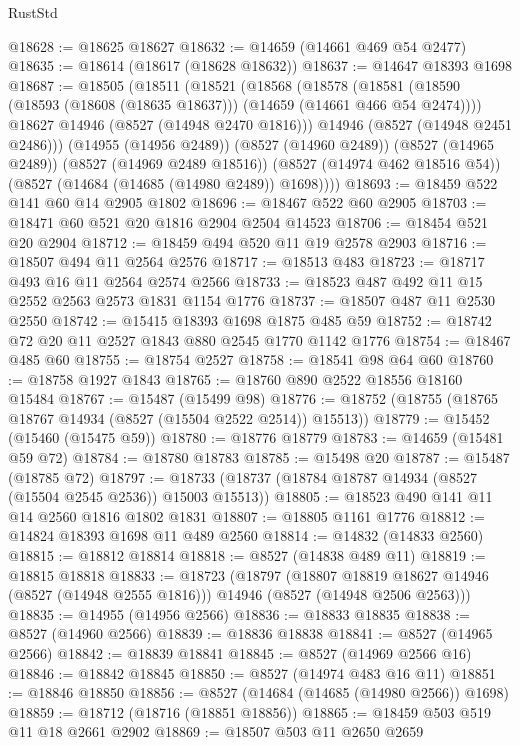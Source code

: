 \begin{lexlean}{RustStd}
\begin{coremodule}
@18628 := @18625 @18627
@18632 := @14659 (@14661 @469 @54 @2477)
@18635 := @18614 (@18617 (@18628 @18632))
@18637 := @14647 @18393 @1698
@18687 := @18505
    (@18511
      (@18521
        (@18568
          (@18578
            (@18581 (@18590 (@18593 (@18608 (@18635 @18637))) (@14659 (@14661 @466 @54 @2474))))
            @18627
            @14946
            (@8527 (@14948 @2470 @1816)))
          @14946
          (@8527 (@14948 @2451 @2486)))
        (@14955 (@14956 @2489))
        (@8527 (@14960 @2489))
        (@8527 (@14965 @2489))
        (@8527 (@14969 @2489 @18516))
        (@8527 (@14974 @462 @18516 @54))
        (@8527 (@14684 (@14685 (@14980 @2489)) @1698))))
@18693 := @18459 @522 @141 @60 @14 @2905 @1802
@18696 := @18467 @522 @60 @2905
@18703 := @18471 @60 @521 @20 @1816 @2904 @2504 @14523
@18706 := @18454 @521 @20 @2904
@18712 := @18459 @494 @520 @11 @19 @2578 @2903
@18716 := @18507 @494 @11 @2564 @2576
@18717 := @18513 @483
@18723 := @18717 @493 @16 @11 @2564 @2574 @2566
@18733 := @18523 @487 @492 @11 @15 @2552 @2563 @2573 @1831 @1154 @1776
@18737 := @18507 @487 @11 @2530 @2550
@18742 := @15415 @18393 @1698 @1875 @485 @59
@18752 := @18742 @72 @20 @11 @2527 @1843 @880 @2545 @1770 @1142 @1776
@18754 := @18467 @485 @60
@18755 := @18754 @2527
@18758 := @18541 @98 @64 @60
@18760 := @18758 @1927 @1843
@18765 := @18760 @890 @2522 @18556 @18160 @15484
@18767 := @15487 (@15499 @98)
@18776 := @18752 (@18755 (@18765 @18767 @14934 (@8527 (@15504 @2522 @2514)) @15513))
@18779 := @15452 (@15460 (@15475 @59))
@18780 := @18776 @18779
@18783 := @14659 (@15481 @59 @72)
@18784 := @18780 @18783
@18785 := @15498 @20
@18787 := @15487 (@18785 @72)
@18797 := @18733 (@18737 (@18784 @18787 @14934 (@8527 (@15504 @2545 @2536)) @15003 @15513))
@18805 := @18523 @490 @141 @11 @14 @2560 @1816 @1802 @1831
@18807 := @18805 @1161 @1776
@18812 := @14824 @18393 @1698 @11 @489 @2560
@18814 := @14832 (@14833 @2560)
@18815 := @18812 @18814
@18818 := @8527 (@14838 @489 @11)
@18819 := @18815 @18818
@18833 := @18723
    (@18797
      (@18807 @18819 @18627 @14946 (@8527 (@14948 @2555 @1816)))
      @14946
      (@8527 (@14948 @2506 @2563)))
@18835 := @14955 (@14956 @2566)
@18836 := @18833 @18835
@18838 := @8527 (@14960 @2566)
@18839 := @18836 @18838
@18841 := @8527 (@14965 @2566)
@18842 := @18839 @18841
@18845 := @8527 (@14969 @2566 @16)
@18846 := @18842 @18845
@18850 := @8527 (@14974 @483 @16 @11)
@18851 := @18846 @18850
@18856 := @8527 (@14684 (@14685 (@14980 @2566)) @1698)
@18859 := @18712 (@18716 (@18851 @18856))
@18865 := @18459 @503 @519 @11 @18 @2661 @2902
@18869 := @18507 @503 @11 @2650 @2659

\end{coremodule}
\end{lexlean}
